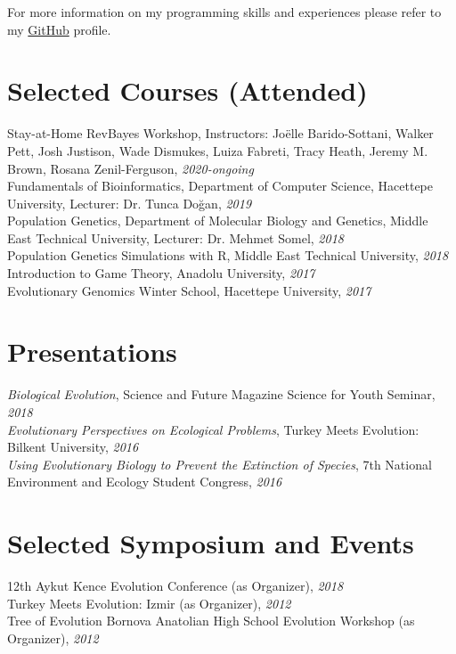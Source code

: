 \documentclass[letterpaper,11pt]{article}
\begin{document}
For more information on my programming skills and experiences please refer to my \href {https://github.com/isinaltinkaya}{GitHub} profile.

\section{Selected Courses (Attended)}
Stay-at-Home RevBayes Workshop, Instructors: Joëlle Barido-Sottani, Walker Pett, Josh Justison, Wade Dismukes, Luiza Fabreti, Tracy Heath, Jeremy M. Brown, Rosana Zenil-Ferguson, \textit{2020-ongoing} \\
Fundamentals of Bioinformatics, Department of Computer Science, Hacettepe University, Lecturer: Dr. Tunca Do\u{g}an,  \textit{2019} \\
Population Genetics, Department of Molecular Biology and Genetics, Middle East Technical University, Lecturer: Dr. Mehmet Somel, \textit{2018} \\
Population Genetics Simulations with R, Middle East Technical University, \textit{2018} \\
Introduction to Game Theory, Anadolu University, \textit{2017} \\
Evolutionary Genomics Winter School, Hacettepe University, \textit{2017} 

\section{Presentations}
{\textit{Biological Evolution}}, Science and Future Magazine Science for Youth Seminar,  \textit{2018} \\
{\textit{Evolutionary Perspectives on Ecological Problems}}, Turkey Meets Evolution: Bilkent University,  \textit{2016} \\
{\textit{Using Evolutionary Biology to Prevent the Extinction of
Species}}, 7th National Environment and Ecology Student Congress,  \textit{2016}

\section{Selected Symposium and Events}
12th Aykut Kence Evolution Conference (as Organizer), \textit{2018} \\
Turkey Meets Evolution: Izmir (as Organizer), \textit{2012} \\
Tree of Evolution Bornova Anatolian High School Evolution Workshop (as Organizer), \textit{2012} \\
\end{document}
